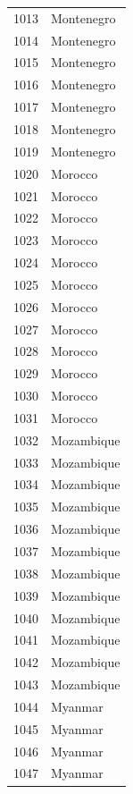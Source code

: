 \documentclass[
  letterpaper,
  DIV=11,
  numbers=noendperiod]{scrreprt}
\begin{document}
\begin{tabular}{ll}
1013 &                Montenegro \\
1014 &                Montenegro \\
1015 &                Montenegro \\
1016 &                Montenegro \\
1017 &                Montenegro \\
1018 &                Montenegro \\
1019 &                Montenegro \\
1020 &                   Morocco \\
1021 &                   Morocco \\
1022 &                   Morocco \\
1023 &                   Morocco \\
1024 &                   Morocco \\
1025 &                   Morocco \\
1026 &                   Morocco \\
1027 &                   Morocco \\
1028 &                   Morocco \\
1029 &                   Morocco \\
1030 &                   Morocco \\
1031 &                   Morocco \\
1032 &                Mozambique \\
1033 &                Mozambique \\
1034 &                Mozambique \\
1035 &                Mozambique \\
1036 &                Mozambique \\
1037 &                Mozambique \\
1038 &                Mozambique \\
1039 &                Mozambique \\
1040 &                Mozambique \\
1041 &                Mozambique \\
1042 &                Mozambique \\
1043 &                Mozambique \\
1044 &                   Myanmar \\
1045 &                   Myanmar \\
1046 &                   Myanmar \\
1047 &                   Myanmar \\

\end{tabular}
\end{document}
